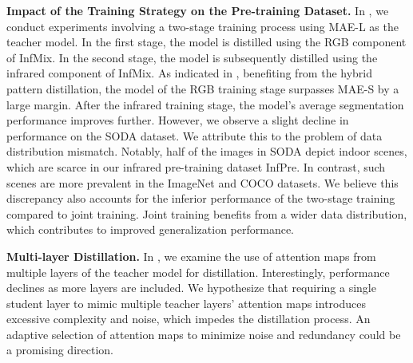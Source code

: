 

\textbf{Impact of the Training Strategy on the Pre-training Dataset.} In , we conduct experiments involving a two-stage training process using MAE-L as the teacher model. In the first stage, the model is distilled using the RGB component of InfMix. In the second stage, the model is subsequently distilled using the infrared component of InfMix. As indicated in , benefiting from the hybrid pattern distillation, the model of the RGB training stage surpasses MAE-S by a large margin. After the infrared training stage, the model's average segmentation performance improves further. However, we observe a slight decline in performance on the SODA dataset. We attribute this to the problem of data distribution mismatch. Notably, half of the images in SODA depict indoor scenes, which are scarce in our infrared pre-training dataset InfPre. In contrast, such scenes are more prevalent in the ImageNet and COCO datasets. We believe this discrepancy also accounts for the inferior performance of the two-stage training compared to joint training. Joint training benefits from a wider data distribution, which contributes to improved generalization performance.

\textbf{Multi-layer Distillation.} In , we examine the use of attention maps from multiple layers of the teacher model for distillation. Interestingly, performance declines as more layers are included. We hypothesize that requiring a single student layer to mimic multiple teacher layers' attention maps introduces excessive complexity and noise, which impedes the distillation process. An adaptive selection of attention maps to minimize noise and redundancy could be a promising direction.

